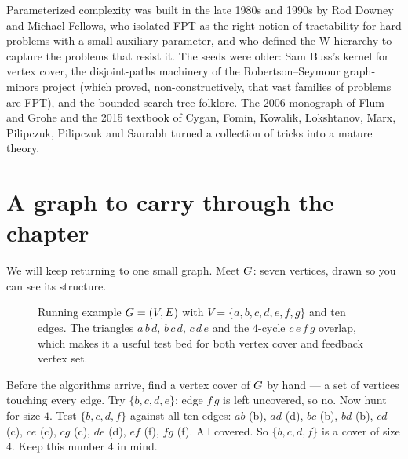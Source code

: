 \begin{historybox}
Parameterized complexity was built in the late 1980s and 1990s by Rod Downey and Michael Fellows, who isolated FPT as the right notion of tractability for hard problems with a small auxiliary parameter, and who defined the W-hierarchy to capture the problems that resist it. The seeds were older: Sam Buss's kernel for vertex cover, the disjoint-paths machinery of the Robertson--Seymour graph-minors project (which proved, non-constructively, that vast families of problems are FPT), and the bounded-search-tree folklore. The 2006 monograph of Flum and Grohe and the 2015 textbook of Cygan, Fomin, Kowalik, Lokshtanov, Marx, Pilipczuk, Pilipczuk and Saurabh turned a collection of tricks into a mature theory.
\end{historybox}

\section{A graph to carry through the chapter}

We will keep returning to one small graph. Meet $G$: seven vertices, drawn so you can see its structure.

\begin{figure}[H]
\centering
{}
\caption{Running example $G=(V,E)$ with $V=\{a,b,c,d,e,f,g\}$ and ten edges. The triangles $a\,b\,d$, $b\,c\,d$, $c\,d\,e$ and the $4$-cycle $c\,e\,f\,g$ overlap, which makes it a useful test bed for both vertex cover and feedback vertex set.}
\label{ch25:fig-running}
\end{figure}

\begin{labbox}
Before the algorithms arrive, find a vertex cover of $G$ by hand --- a set of vertices touching every edge. Try $\{b,c,d,e\}$: edge $f\,g$ is left uncovered, so no. Now hunt for size $4$. Test $\{b,c,d,f\}$ against all ten edges: $ab$ (b), $ad$ (d), $bc$ (b), $bd$ (b), $cd$ (c), $ce$ (c), $cg$ (c), $de$ (d), $ef$ (f), $fg$ (f). All covered. So $\{b,c,d,f\}$ is a cover of size $4$. Keep this number $4$ in mind.
\end{labbox}

